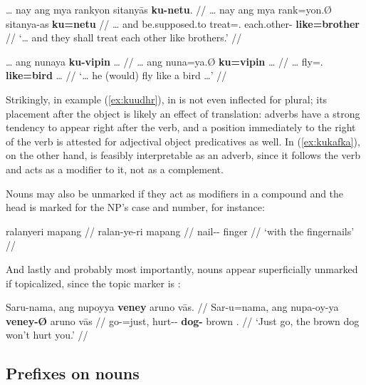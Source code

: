 \pex
\a\label{ex:kuudhr}\begingl
	\gla … nay ang mya rankyon sitanyās \textbf{ku-netu}. //
	\glb … nay ang mya rank=yon.Ø sitanya-as \textbf{ku=netu} //
	\glc … and \AgtT{} be.supposed.to treat=\TplN{}.\Top{} 
		each.other-\Parg{} \textbf{like=brother} //
	\glft `… and they shall treat each other like brothers.'\footnotemark%
	//
\endgl

\a\label{ex:kukafka}\begingl
	\gla … ang nunaya \textbf{ku-vipin} … //
	\glb … ang nuna=ya.Ø \textbf{ku=vipin} … //
	\glc … \AgtT{} fly=\TsgM{}.\Top{} \textbf{like=bird} … //
	\glft `… he (would) fly like a bird …'%
	//
\endgl

\xe


Strikingly, in example (\ref{ex:kuudhr}),  in 
 is not even inflected for plural; its 
placement after the object is likely an effect of translation: adverbs 
have a strong tendency to appear right after the verb, and a position 
immediately to the right of the verb is attested for adjectival object 
predicatives as well. In (\ref{ex:kukafka}), on the other hand, 
 is feasibly interpretable as an adverb, 
since it follows the verb and acts as a modifier to it, not as a complement.

Nouns may also be unmarked if they act as modifiers in a compound and the head 
is marked for the NP's case and number, for instance:

\ex\begingl
	\gla ralanyeri mapang //
	\glb ralan-ye-ri mapang //
	\glc nail-\Pl{}-\Ins{} finger //
	\glft `with the fingernails' //
\endgl\xe

And lastly and probably most importantly, nouns appear superficially unmarked 
if topicalized, since the topic marker is :

\ex\begingl
	\gla Saru-nama, ang nupoyya \textbf{veney} aruno vās. //
	\glb Sar-u=nama, ang nupa-oy-ya \textbf{veney-Ø} aruno vās //
	\glc go-\Imp{}=just, \AgtT{} hurt-\Neg{}-\TsgM{} \textbf{dog-\Top{}} 
 		brown \Ssg{}.\Parg{} //
	\glft `Just go, the brown dog won't hurt you.' //
\endgl\xe


\subsection{Prefixes on nouns}
\label{subsec:nounpref}

